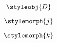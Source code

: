 {\begin{forslides}
        \begin{equation}
            \label{eq:50}
            \styleobj{D}
        \end{equation}

        \begin{equation}
            \label{eq:51}
            \stylemorph{j}
        \end{equation}

        \begin{equation}
            \label{eq:52}
            \stylemorph{k}
        \end{equation}

    \end{forslides}
}


